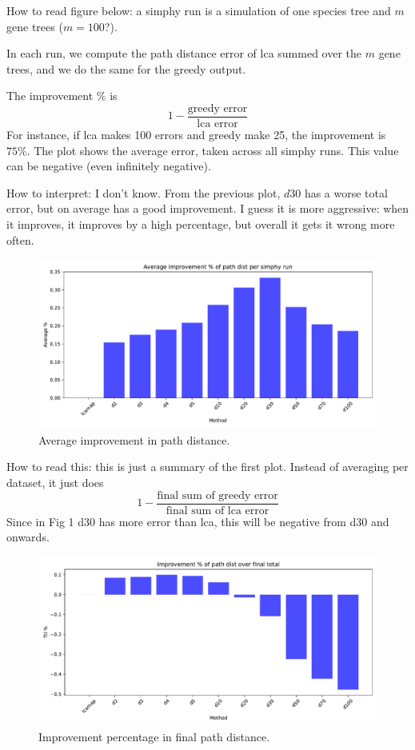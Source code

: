 \documentclass{article}
\begin{document}
\clearpage 


How to read figure below: a simphy run is a simulation of one species tree and $m$ gene trees ($m = 100$?).  

In each run, we compute the path distance error  of lca summed over the $m$ gene trees, and we do the same for the greedy output.  

The improvement $\%$ is 
\[
1 - \frac{\mbox{greedy error}}{\mbox{lca error}}
\]
For instance, if lca makes 100 errors and greedy make 25, the improvement is $75\%$.
The plot shows the average error, taken across all simphy runs.
This value can be negative (even infinitely negative).

How to interpret: I don't know.  From the previous plot, $d30$ has a worse total error, but on average has a good improvement.  I guess it is more aggressive: when it improves, it improves by a high percentage, but overall it gets it wrong more often.

\begin{figure}[H]
    \centering
    \includegraphics[width=\textwidth]{plots/avgpctimprov.pdf}
    \caption{Average improvement in path distance.  }
    \label{fig:enter-label}
\end{figure}



\clearpage



How to read this: this is just a summary of the first plot.  Instead of averaging per dataset, it just does
\[
1 - \frac{\mbox{final sum of greedy error}}{\mbox{final sum of lca error}}
\]
Since in Fig 1 d30 has more error than lca, this will be negative from d30 and onwards.


\begin{figure}[H]
    \centering
    \includegraphics[width=\textwidth]{plots/pctimprov.pdf}
    \caption{Improvement percentage in final path distance.  }
    \label{fig:enter-label}
\end{figure}
\end{document}
